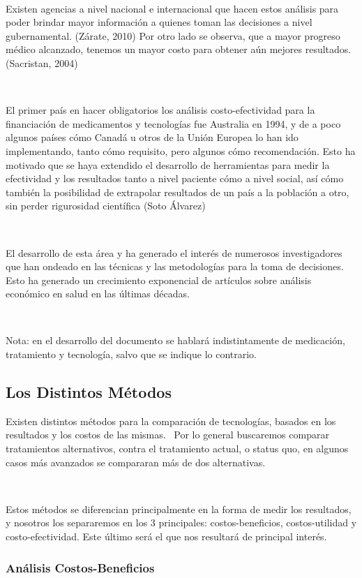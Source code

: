 \documentclass{article}
\begin{document}
\

Existen agencias a nivel nacional e internacional que hacen estos análisis para poder brindar mayor información a quienes toman las decisiones a nivel gubernamental. (Zárate, 2010) Por otro lado se observa, que a mayor progreso médico alcanzado, tenemos un mayor costo para obtener aún mejores resultados. (Sacristan, 2004)

\

El primer país en hacer obligatorios los análisis costo-efectividad para la financiación de medicamentos y tecnologías fue Australia en 1994, y de a poco algunos países cómo Canadá u otros de la Unión Europea lo han ido implementando, tanto cómo requisito, pero algunos cómo recomendación. Esto ha motivado que se haya extendido el desarrollo de herramientas para medir la efectividad y los resultados tanto a nivel paciente cómo a nivel social, así cómo también la posibilidad de extrapolar resultados de un país a la población a otro, sin perder rigurosidad científica (Soto Álvarez)

\

El desarrollo de esta área y ha generado el interés de numerosos investigadores que han ondeado en las técnicas y las metodologías para la toma de decisiones. Esto ha generado un crecimiento exponencial de artículos sobre análisis económico en salud en las últimas décadas.

\

Nota: en el desarrollo del documento se hablará indistintamente de medicación, tratamiento y tecnología, salvo que se indique lo contrario.

\subsection{Los Distintos Métodos}

Existen distintos métodos para la comparación de tecnologías, basados en los resultados y los costos de las mismas.
\
Por lo general buscaremos comparar tratamientos alternativos, contra el tratamiento actual, o status quo, en algunos casos más avanzados se compararan más de dos alternativas.

\

Estos métodos se diferencian principalmente en la forma de medir los resultados, y nosotros los separaremos en los 3 principales: costos-beneficios, costos-utilidad y costo-efectividad. Este último será el que nos resultará de principal interés.

\subsubsection{Análisis Costos-Beneficios}
\end{document}
